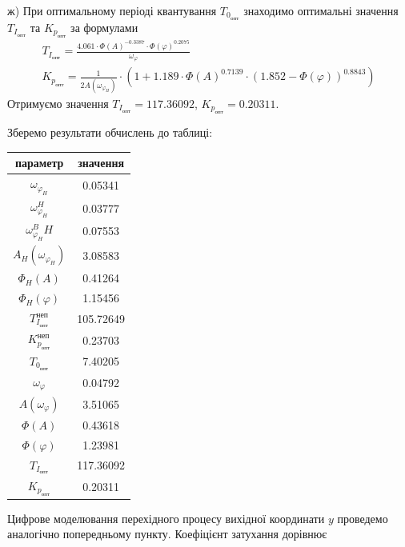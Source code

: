 ж)\; При оптимальному періоді квантування $T_{0_{\text{опт}}}$ знаходимо 
оптимальні значення $T_{I_{\text{опт}}}$ та $K_{p_{\text{опт}}}$ за формулами
\begin{gather}
    T_{I_{\text{опт}}} = 
    \frac{4.061 \cdot \Phi(A)^{-0.3387} \cdot \Phi(\varphi)^{0.2075}}{\omega_{\varphi}} \\
    K_{p_{\text{опт}}} = \frac{1}{2 A\left(\omega_{\varphi_H}\right)}
    \cdot \left(
        1 + 1.189 \cdot \Phi(A)^{0.7139}\cdot \left(1.852 - \Phi(\varphi)\right)^{0.8843}
    \right)
\end{gather}
Отримуємо значення
$T_{I_{\text{опт}}} = 117.36092$, $K_{p_{\text{опт}}} = 0.20311$.

Зберемо результати обчислень до таблиці:
\begin{center}
    \begin{tabular}{|c|c|}
        \hline
        параметр & значення \\
        \hline
        $\omega_{\varphi_H}$ & 0.05341\\
        \hline
        $\omega_{\varphi_H}^H$ & 0.03777\\
        \hline
        $\omega_{\varphi_H}^BH$ & 0.07553\\
        \hline
        $A_H\left(\omega_{\varphi_H}\right)$ & 3.08583\\
        \hline
        $\Phi_H(A)$ & 0.41264\\
        \hline
        $\Phi_H(\varphi)$ & 1.15456\\
        \hline
        $T_{I_{\text{опт}}}^{\text{неп}}$ & 105.72649\\
        \hline
        $K_{p_{\text{опт}}}^{\text{неп}}$ & 0.23703\\
        \hline
        $T_{0_{\text{опт}}}$ & 7.40205\\
        \hline
        $\omega_{\varphi}$ & 0.04792\\
        \hline
        $A\left(\omega_{\varphi}\right)$ & 3.51065\\
        \hline
        $\Phi(A)$ & 0.43618\\
        \hline
        $\Phi(\varphi)$ & 1.23981\\
        \hline
        $T_{I_{\text{опт}}}$ & 117.36092\\
        \hline
        $K_{p_{\text{опт}}}$ & 0.20311\\
        \hline
     \end{tabular}
\end{center}
Цифрове моделювання перехідного процесу вихідної координати $y$ проведемо аналогічно попередньому пункту. Коефіцієнт затухання дорівнює 
